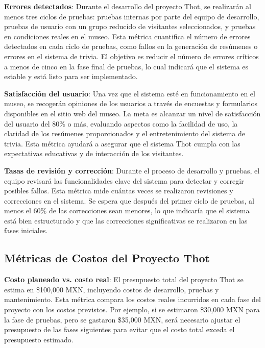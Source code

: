 \documentclass{report}
\begin{document}
    \justify
    \textbf{Errores detectados}: Durante el desarrollo del proyecto Thot, se realizarán al menos tres ciclos de pruebas: pruebas internas por parte del equipo de desarrollo, pruebas de usuario con un grupo reducido de visitantes seleccionados, y pruebas en condiciones reales en el museo. Esta métrica cuantifica el número de errores detectados en cada ciclo de pruebas, como fallos en la generación de resúmenes o errores en el sistema de trivia. El objetivo es reducir el número de errores críticos a menos de cinco en la fase final de pruebas, lo cual indicará que el sistema es estable y está listo para ser implementado.

    \justify
    \textbf{Satisfacción del usuario}: Una vez que el sistema esté en funcionamiento en el museo, se recogerán opiniones de los usuarios a través de encuestas y formularios disponibles en el sitio web del museo. La meta es alcanzar un nivel de satisfacción del usuario del 80\% o más, evaluando aspectos como la facilidad de uso, la claridad de los resúmenes proporcionados y el entretenimiento del sistema de trivia. Esta métrica ayudará a asegurar que el sistema Thot cumpla con las expectativas educativas y de interacción de los visitantes.

    \justify
    \textbf{Tasas de revisión y corrección}: Durante el proceso de desarrollo y pruebas, el equipo revisará las funcionalidades clave del sistema para detectar y corregir posibles fallos. Esta métrica mide cuántas veces se realizaron revisiones y correcciones en el sistema. Se espera que después del primer ciclo de pruebas, al menos el 60\% de las correcciones sean menores, lo que indicaría que el sistema está bien estructurado y que las correcciones significativas se realizaron en las fases iniciales.

    \subsection{Métricas de Costos del Proyecto Thot}

    \justify
    \textbf{Costo planeado vs. costo real}: El presupuesto total del proyecto Thot se estima en \$100,000 MXN, incluyendo costos de desarrollo, pruebas y mantenimiento. Esta métrica compara los costos reales incurridos en cada fase del proyecto con los costos previstos. Por ejemplo, si se estimaron \$30,000 MXN para la fase de pruebas, pero se gastaron \$35,000 MXN, será necesario ajustar el presupuesto de las fases siguientes para evitar que el costo total exceda el presupuesto estimado.
\end{document}
